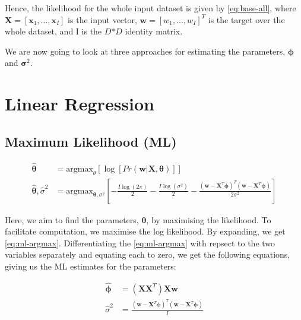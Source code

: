 \documentclass[11pt,openright,a4paper]{article}
\numberwithin{equation}{section}
\begin{document}
Hence, the likelihood for the whole input dataset is given by \autoref{eq:base-all}, where $\mathbf{X} = [ \mathbf{x}_1,...,\mathbf{x}_I ]$ is the input vector, $\mathbf{w} = [w_1,...,w_I]^T$ is the target over the whole dataset, and I is the $D$*$D$ identity matrix.

We are now going to look at three approaches for estimating the parameters, $\boldsymbol{\phi}$ and $\boldsymbol{\sigma}^2$.


\section{Linear Regression} \label{sec:approaches}

\subsection{Maximum Likelihood (ML)} \label{ssec:apporaches-ml}

\begin{equation} \label{eq:ml-argmax}
    \begin{aligned}
        \hat{\boldsymbol\theta} &=
            \mathrm{argmax}_{\theta}
                \left [
                    \log{\left [ Pr \left ( \mathbf{w} | \mathbf{X}, \boldsymbol\theta \right ) \right ]}
                \right ]
        \\
        \hat{\boldsymbol\theta}, \hat{\sigma}^2 &=
            \mathrm{argmax}_{\boldsymbol\theta, \sigma^2}
            \left [
                - \frac{ I \log{\left ( 2 \pi  \right )} }{2}
                - \frac{ I \log{\left ( \sigma^2  \right )} }{2}
                - \frac{\left ( \mathbf{w} - \mathbf{X}^T\boldsymbol\phi \right )^T  \left ( \mathbf{w} - \mathbf{X}^T\boldsymbol\phi \right )}
                       {2\sigma^2}
            \right ]
    \end{aligned}
\end{equation}

Here, we aim to find the parameters, $\boldsymbol\theta$, by maximising the likelihood. To facilitate computation, we maximise the log likelihood. By expanding, we get \autoref{eq:ml-argmax}. Differentiating the \autoref{eq:ml-argmax} with repsect to the two variables separately and equating each to zero, we get the following equations, giving us the ML estimates for the parameters:

\begin{equation} \label{eq:ml-params}
    \begin{aligned}
        \hat{\boldsymbol\phi} &=
            \left ( \mathbf{XX}^T  \right ) \mathbf{Xw}
        \\
        \hat{\sigma}^2 &=
            \frac{\left ( \mathbf{w} - \mathbf{X}^T\boldsymbol\phi \right )^T  \left ( \mathbf{w} - \mathbf{X}^T\boldsymbol\phi \right )}{I}
    \end{aligned}
\end{equation}
\end{document}
